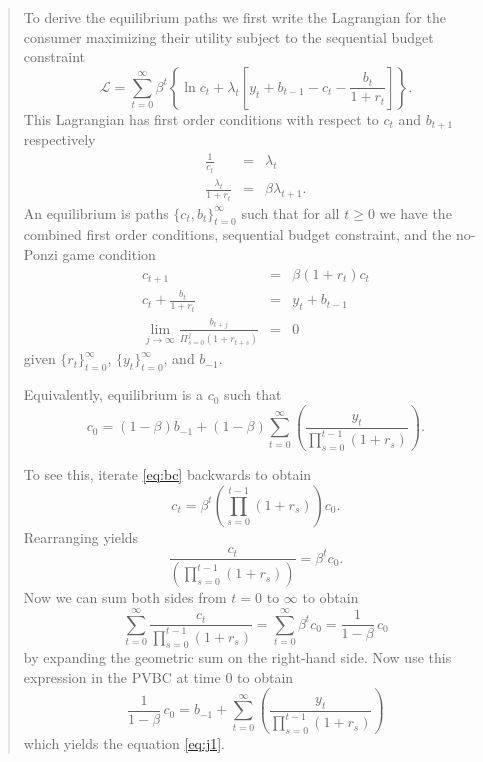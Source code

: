 \begin{exercise}
\begin{quote}
\begin{enumerate}
To derive the equilibrium paths we first write the Lagrangian for the consumer maximizing their utility subject to the sequential budget constraint
\[
\mathcal{L} = \sum_{t=0}^{\infty} \beta^t \left\{
\ln c_t + \lambda_t \left[ y_t  + b_{t-1} - c_t - \frac{b_t}{1+r_t} \right]\right\}.
\]
This Lagrangian has first order conditions with respect to $c_t$ and $b_{t+1}$ respectively
\begin{eqnarray*}
\frac{1}{c_t}& = &\lambda_t\\
\frac{\lambda_t}{1+r_t} &=& \beta \lambda_{t+1}.
\end{eqnarray*}
An equilibrium is paths $\{c_t,  b_t\}_{t=0}^{\infty}$ such that for all $t\ge 0$ we have the combined first order conditions, sequential budget constraint, and the no-Ponzi game condition
\begin{eqnarray}
c_{t+1}&=& \beta (1+r_t)c_t\\
\label{eq:bc}
c_t + \frac{b_t}{1+r_t}& = &y_t  + b_{t-1}\\
\label{eq:tvc}
\lim_{j\rightarrow \infty} \frac{b_{t+j}}{\Pi_{s=0}^j (1+r_{t+s})}&= &0 
\end{eqnarray}
given $\{r_t\}_{t=0}^{\infty}$, $\{y_t\}_{t=0}^{\infty}$, and $b_{-1}$.

Equivalently, equilibrium is a $c_0$ such that 
\begin{equation}
c_0 = (1-\beta) b_{-1}
+ (1-\beta)  \sum_{t=0}^{\infty} 
\left(
\frac
{y_{t} }
{\displaystyle \prod_{s=0}^{t-1} (1+r_{s})} 
\right).
\label{eq:j1}
\end{equation}

To see this, iterate \eqref{eq:bc} backwards to obtain
\begin{equation}
c_t = \beta^t\left( \prod_{s=0}^{t-1} (1+r_s)\right) c_0.
\label{eq:j2}
\end{equation}
Rearranging yields 
\begin{equation*}
    \frac{c_t}{\left( \prod_{s=0}^{t-1} (1+r_s)\right)} = \beta^t c_0.
\end{equation*}
Now we can sum both sides from $t=0$ to $\infty$ to obtain
\begin{equation*}
    \sum_{t=0}^{\infty} 
    \frac{c_{t}}{\prod_{s=0}^{t-1}(1+r_{s})} 
    = \sum_{t=0}^{\infty} \beta^t c_0 = \frac{1}{1-\beta}\, c_0
\end{equation*}
by expanding the geometric sum on the right-hand side. Now use this expression in the PVBC at time 0 to obtain 
\begin{equation*}
    \frac{1}{1-\beta}\, c_0 = b_{-1} + \sum_{t=0}^{\infty} 
    \left(
    \frac{y_{t}}{\prod_{s=0}^{t-1} (1+r_{s})} 
    \right)
\end{equation*}
which yields the equation \eqref{eq:j1}.


\end{enumerate}
\end{quote}
\end{exercise}
